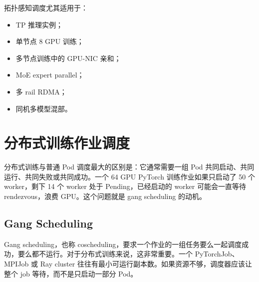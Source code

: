拓扑感知调度尤其适用于：

\begin{itemize}
  \item TP 推理实例；
  \item 单节点 8 GPU 训练；
  \item 多节点训练中的 GPU-NIC 亲和；
  \item MoE expert parallel；
  \item 多 rail RDMA；
  \item 同机多模型混部。
\end{itemize}

\section{分布式训练作业调度}
\label{sec:distributed-training-scheduling}

分布式训练与普通 Pod 调度最大的区别是：它通常需要一组 Pod 共同启动、共同运行、共同失败或共同成功。一个 64 GPU PyTorch 训练作业如果只启动了 50 个 worker，剩下 14 个 worker 处于 Pending，已经启动的 worker 可能会一直等待 rendezvous，浪费 GPU。这个问题就是 gang scheduling 的动机。

\subsection{Gang Scheduling}
\label{subsec:gang-scheduling}

Gang scheduling，也称 coscheduling，要求一个作业的一组任务要么一起调度成功，要么都不运行。对于分布式训练来说，这非常重要。一个 PyTorchJob、MPIJob 或 Ray cluster 往往有最小可运行副本数。如果资源不够，调度器应该让整个 job 等待，而不是只启动一部分 Pod。

